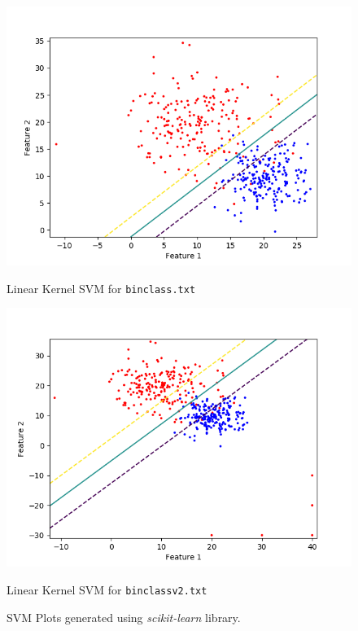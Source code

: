 \documentclass[a4paper,11pt]{article}
\begin{document}
\begin{mlsolution}
    \begin{figure}[h]
        \centering
        \begin{minipage}{0.5\textwidth}
            \centering
            \includegraphics[width=\textwidth]{Part1_Task3.png} %
            \caption*{Linear Kernel SVM for \texttt{binclass.txt}}
        \end{minipage}\hfill
        \begin{minipage}{0.5\textwidth}
            \centering
            \includegraphics[width=\textwidth]{Part2_Task3.png} %
            \caption*{Linear Kernel SVM for \texttt{binclassv2.txt}}
        \end{minipage}
        \caption{SVM Plots generated using \textsl{scikit-learn} library.}
    \end{figure}


\end{mlsolution}
\end{document}
